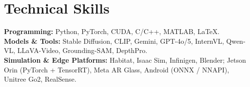 \documentclass[11pt, letterpaper]{article}
\begin{document}
\section{Technical Skills}
\textbf{Programming:} Python, PyTorch, CUDA, C/C++, MATLAB, LaTeX.\\[2pt]
\textbf{Models \& Tools:} Stable Diffusion, CLIP, Gemini, GPT-4o/5, InternVL, Qwen-VL, LLaVA-Video, Grounding-SAM, DepthPro.\\[2pt]
\textbf{Simulation \& Edge Platforms:} Habitat, Isaac Sim, Infinigen, Blender; Jetson Orin (PyTorch + TensorRT), Meta AR Glass, Android (ONNX / NNAPI), Unitree Go2, RealSense.
\end{document}
